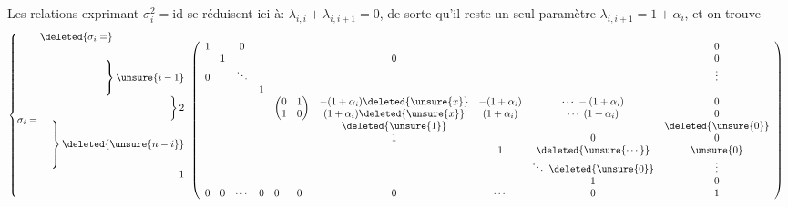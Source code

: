 Les relations exprimant $\sigma_i^2=\mathrm{id}$ se réduisent ici à: $\lambda_{i,i}+\lambda_{i,i+1}=0$, de sorte qu'il reste un seul paramètre $\lambda_{i,i+1}=1+\alpha_i$, et on trouve
\[
\left\{\begin{aligned}
&\deleted{\sigma_i=}\\[-1.5ex]
\sigma_i={}&
\begin{array}{c@{\,}l}
\begin{array}{r}
\left.\vphantom{\begin{matrix}1\\1\\1\end{matrix}}\right\}\unsure{i-1}\\
\left.\vphantom{\begin{matrix}1\\1\end{matrix}}\right\}2\\
\left.\vphantom{\begin{matrix}1\\1\\1\\1\end{matrix}}\right\}\deleted{\unsure{n-i}}\\
1
\end{array}
&\left(\begin{array}{cccccccccc}
1&&0&&&&&&&0\\
&1&&&&&0&&&0\\
0&&\ddots&&&&&&&\vdots\\
&&&1&&&&&&\\
&&&&\multicolumn{2}{c}{\left(\begin{matrix}0&1\\1&0\end{matrix}\right)}&\begin{matrix}-(1+\alpha_i)\deleted{\unsure{x}}\\(1+\alpha_i)\deleted{\unsure{x}}\end{matrix}&\begin{matrix}-(1+\alpha_i)\\(1+\alpha_i)\end{matrix}&\begin{matrix}\cdots\;-(1+\alpha_i)\\\cdots\;(1+\alpha_i)\end{matrix}&\begin{matrix}0\\0\end{matrix}\\
&&&&&&\deleted{\unsure{1}}&&&\deleted{\unsure{0}}\\
&&&&&&1&&0&0\\
&&&&&&&1&\deleted{\unsure{\cdots}}&\unsure{0}\\
&&&&&&&&\ddots\ \deleted{\unsure{0}}&\vdots\\
&&&&&&&&1&0\\
0&0&\cdots&0&0&0&0&\cdots&0&1
\end{array}\right)
\end{array}
\end{aligned}\right.
\]

